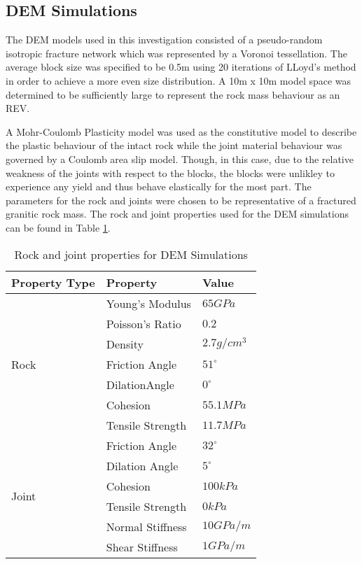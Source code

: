 \subsection{DEM Simulations}

The DEM models used in this investigation consisted of a pseudo-random isotropic fracture network which was represented by a Voronoi tessellation. The average block size was specified to be 0.5m using 20 iterations of LLoyd's method \citep{Lloyd_1982} in order to achieve a more even size distribution. A 10m x 10m model space was determined to be sufficiently large to represent the rock mass behaviour as an REV. 

A Mohr-Coulomb Plasticity model was used as the constitutive model to describe the plastic behaviour of the intact rock while the joint material behaviour was governed by a Coulomb area slip model. Though, in this case, due to the relative weakness of the joints with respect to the blocks, the blocks were unlikley to experience any yield and thus behave elastically for the most part. The parameters for the rock and joints were chosen to be representative of a fractured granitic rock mass. The rock and joint properties used for the DEM simulations can be found in Table \ref{tab:demProp}.

\begin{table}[!htbp]
\centering
\caption{Rock and joint properties for DEM Simulations}
\label{tab:demProp}
\begin{tabular}{@{}lll@{}}
\toprule
Property Type          & Property         & Value        \\ \midrule
\multirow{7}{*}{Rock}  & Young's Modulus  & $65 GPa$     \\
                       & Poisson's Ratio  & $0.2$        \\
                       & Density          & $2.7 g/cm^3$ \\
                       & Friction Angle   & $51^{\circ}$ \\
                       & DilationAngle    & $0^{\circ}$  \\
                       & Cohesion         & $55.1 MPa$   \\
                       & Tensile Strength & $11.7 MPa$   \\ \cmidrule(r){1-1}
\multirow{6}{*}{Joint} & Friction Angle   & $32^{\circ}$ \\
                       & Dilation Angle   & $5^{\circ}$  \\
                       & Cohesion         & $100 kPa$    \\
                       & Tensile Strength & $0 kPa$      \\
                       & Normal Stiffness & $10 GPa/m$   \\
                       & Shear Stiffness  & $1 GPa/m$    \\ \bottomrule
\end{tabular}
\end{table}


